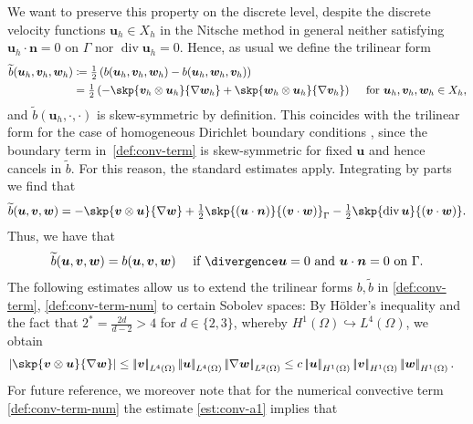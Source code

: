 \documentclass[reqno,a4paper]{amsart}
\def\abs#1{\left| #1 \right|}
\def\norm#1{\left|\!\left| #1 \right|\!\right|}
\def\vec#1{\boldsymbol{#1}}
\def\diver{\mathop{\mathrm{div}}\nolimits} %
\def\bn{\vec{n}}
\def\bu{\vec{u}}
\def\bv{\vec{v}}
\def\bw{\vec{w}}
\def\Xh{X_{h}}
\begin{document}
We want to preserve this property on the discrete level, despite the discrete velocity functions $\bu_h \in X_h$ in the Nitsche method in general neither satisfying $\bu_h \cdot \bn = 0$  on $\Gamma$ nor $\diver \bu_h = 0$. 
%
Hence, as usual we define the trilinear form 
\begin{equation}\label{def:conv-term-num}
	\begin{aligned}
		\widetilde{b}(\bu_h, \bv_h, \bw_h) &\coloneqq \tfrac{1}{2} \left(b(\bu_h, \bv_h, \bw_h) - b(\bu_h, \bw_h, \bv_h) \right)\\
		& = \tfrac{1}{2}
		\left( - \skp{\bv_h \otimes \bu_h}{\nabla \bw_h} 
		+ \skp{\bw_h \otimes \bu_h}{\nabla \bv_h} \right) 
		\quad \text{ for } \bu_h, \bv_h, \bw_h \in \Xh,
	\end{aligned}
\end{equation}
and $\widetilde{b}(\bu_h, \cdot, \cdot)$ is skew-symmetric by definition. 
This coincides with the trilinear form for the case of homogeneous Dirichlet boundary conditions \cite{Temam1984}, since the boundary term in~\eqref{def:conv-term} is skew-symmetric for fixed $\bu$ and hence cancels in $\widetilde{b}$. 
For this reason, the standard estimates apply. 
Integrating by parts we find that 
\begin{align} \label{eq:conv-id}
	\widetilde{b}(\bu, \bv, \bw)
	=-\skp{\bv \otimes \bu}{ \nabla \bw}
	+ \tfrac{1}{2} \skp{(\bu \cdot \bn)}{ (\bv \cdot \bw)}_{\Gamma}
	- \tfrac{1}{2} \skp{\diver \bu}{(\bv \cdot \bw)}.  
\end{align}
Thus, we have that
\begin{align}\label{eq:conv-id-2}
	\widetilde{b}(\bu, \bv, \bw) = b(\bu, \bv, \bw) \quad \text{ if } \divergence  \bu = 0 \text{ and } \bu \cdot \bn = 0 \text{ on } \Gamma. 
\end{align} 
The following estimates allow us to extend the trilinear forms $b, \widetilde{b}$ in \eqref{def:conv-term}, \eqref{def:conv-term-num} to certain Sobolev spaces: 
%
By Hölder's inequality and the fact that $2^* =  \frac{2d}{d-2} > 4$ for $d \in \{2,3\}$, whereby $H^1(\Omega) \hookrightarrow L^4(\Omega)$, we obtain 
\begin{align}\label{est:conv-a1}
	\abs{\skp{\bv\otimes \bu}{\nabla\bw}} 
	&\leq 
	\norm{\bv}_{L^4(\Omega)} 
	\norm{\bu}_{L^4(\Omega)} 
	\norm{\nabla \bw}_{L^2(\Omega)}
	\leq 
	c \norm{\bu}_{H^1(\Omega)} \norm{\bv}_{H^1(\Omega)} \norm{\bw}_{H^1(\Omega)}.  
\end{align}
For future reference, we moreover note that for the numerical convective term \eqref{def:conv-term-num} the estimate \eqref{est:conv-a1}  implies that 
\end{document}

